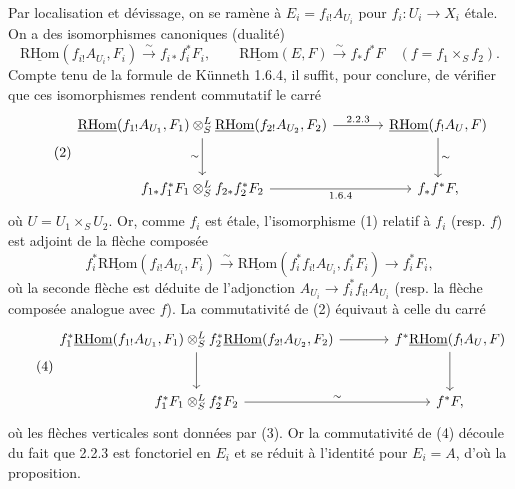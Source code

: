\documentclass[11pt]{article}
\providecommand{\RHom}{\mathrm{RHom}}
\providecommand{\uRHom}{\underline{\RHom}}
\providecommand{\RHom}{\mathrm{RHom}}
\providecommand{\RHom}{\mathrm R\mathcal{H}om}
\providecommand{\RHom}{\mathrm{RHom}}
\begin{document}
Par localisation et dévissage, on se ramène à $E_i=f_{i!}A_{U_i}$ pour $f_i:U_i\to X_i$ étale. On a des isomorphismes canoniques (dualité)
\begin{equation}\tag{1}
\uRHom(f_{i!}A_{U_i},F_i)\xrightarrow{\sim}f_{i*}f_i^{*}F_i,
\qquad
\uRHom(E,F)\xrightarrow{\sim}f_{*}f^{*}F\quad(f=f_1\times_S f_2).
\end{equation}
Compte tenu de la formule de Künneth 1.6.4, il suffit, pour conclure, de vérifier que ces isomorphismes rendent commutatif le carré
\begin{equation}\tag{2}
\begin{tikzcd}[column sep=large,row sep=large]
\uRHom(f_{1!}A_{U_1},F_1)\otimes^{L}_{S}\uRHom(f_{2!}A_{U_2},F_2) \arrow[r,"2.2.3"] \arrow[d,"\sim"'] & \uRHom(f_{!}A_U,F) \arrow[d,"\sim"]\\
f_{1*}f_1^{*}F_1\otimes^{L}_{S}f_{2*}f_2^{*}F_2 \arrow[r,"1.6.4"'] & f_{*}f^{*}F,
\end{tikzcd}
\end{equation}
où $U=U_1\times_S U_2$. Or, comme $f_i$ est étale, l'isomorphisme (1) relatif à $f_i$ (resp. $f$) est adjoint de la flèche composée
\begin{equation}\tag{3}
f_i^{*}\uRHom(f_{i!}A_{U_i},F_i)\xrightarrow{\sim}\uRHom(f_i^{*}f_{i!}A_{U_i},f_i^{*}F_i)\longrightarrow f_i^{*}F_i,
\end{equation}
où la seconde flèche est déduite de l'adjonction $A_{U_i}\to f_i^{*}f_{i!}A_{U_i}$ (resp. la flèche composée analogue avec $f$). La commutativité de (2) équivaut à celle du carré
\begin{equation}\tag{4}
\begin{tikzcd}[column sep=large,row sep=large]
f_1^{*}\uRHom(f_{1!}A_{U_1},F_1)\otimes^{L}_{S}f_2^{*}\uRHom(f_{2!}A_{U_2},F_2) \arrow[r] \arrow[d] & f^{*}\uRHom(f_{!}A_U,F) \arrow[d]\\
f_1^{*}F_1\otimes^{L}_{S}f_2^{*}F_2 \arrow[r,"\sim"] & f^{*}F,
\end{tikzcd}
\end{equation}
où les flèches verticales sont données par (3). Or la commutativité de (4) découle du fait que 2.2.3 est fonctoriel en $E_i$ et se réduit à l'identité pour $E_i=A$, d'où la proposition.
\end{document}
